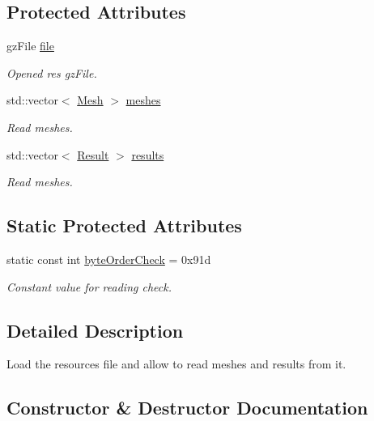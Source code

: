 \subsection*{Protected Attributes}
\begin{DoxyCompactItemize}
\item 
gz\+File \hyperlink{classBinaryData_a9eae74bdf3b91a3e1461802d820591e3}{file}
\begin{DoxyCompactList}\small\item\em Opened res gz\+File. \end{DoxyCompactList}\item 
std\+::vector$<$ \hyperlink{classMesh}{Mesh} $>$ \hyperlink{classBinaryData_af5e37d66b40c5cc7d835bac81a165b14}{meshes}
\begin{DoxyCompactList}\small\item\em Read meshes. \end{DoxyCompactList}\item 
std\+::vector$<$ \hyperlink{classResult}{Result} $>$ \hyperlink{classBinaryData_a81c3bb02cb37946f441ce336bdf43784}{results}
\begin{DoxyCompactList}\small\item\em Read meshes. \end{DoxyCompactList}\end{DoxyCompactItemize}
\subsection*{Static Protected Attributes}
\begin{DoxyCompactItemize}
\item 
static const int \hyperlink{classBinaryData_a4e95a7b65e2fa6374d92108bb90eaf5b}{byte\+Order\+Check} = 0x91d
\begin{DoxyCompactList}\small\item\em Constant value for reading check. \end{DoxyCompactList}\end{DoxyCompactItemize}


\subsection{Detailed Description}
Load the resources file and allow to read meshes and results from it. 

\subsection{Constructor \& Destructor Documentation}
\mbox{\label{classBinaryData_a0bba582d92f95dc186e3c36ea9ddcd36}} 
